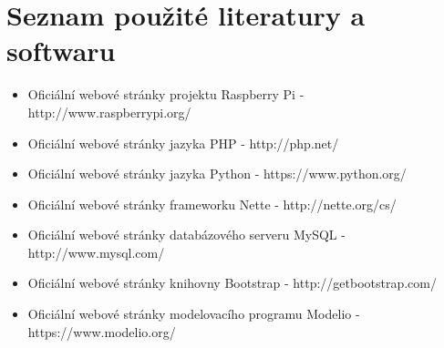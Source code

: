 \documentclass[12pt, a4paper, oneside]{article}
\begin{document}
\newpage

\section*{Seznam použité literatury a softwaru}

\begin{itemize}
\item Oficiální webové stránky projektu Raspberry Pi - http://www.raspberrypi.org/
\item Oficiální webové stránky jazyka PHP - http://php.net/
\item Oficiální webové stránky jazyka Python - https://www.python.org/
\item Oficiální webové stránky frameworku Nette - http://nette.org/cs/
\item Oficiální webové stránky databázového serveru MySQL - http://www.mysql.com/
\item Oficiální webové stránky knihovny Bootstrap - http://getbootstrap.com/
\item Oficiální webové stránky modelovacího programu Modelio - https://www.modelio.org/
\end{itemize}
\end{document}
